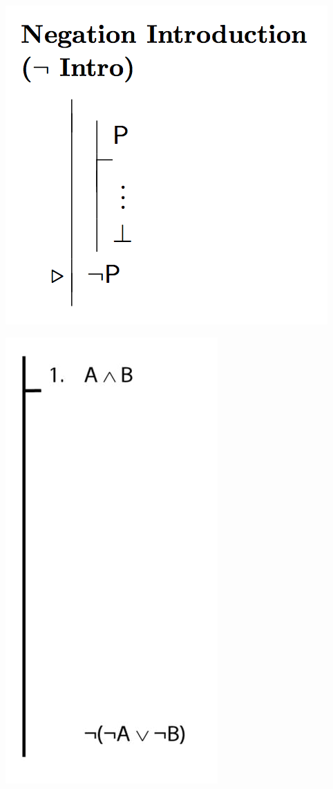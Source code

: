 \documentclass[12pt]{extarticle}
\begin{document}
\begin{multicols*}{3}
\begin{center}
\includegraphics[scale=0.3]{img/rule_negation_intro.png}
\end{center}
\begin{center}
\includegraphics[scale=0.3]{img/proof_example_unit_281.png}
\end{center}




\end{multicols*}
\end{document}
